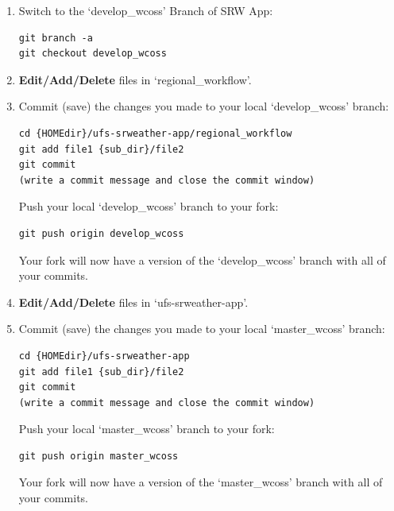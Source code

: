 \documentclass[11pt,fleqn]{report}              %
\begin{document}
\begin{enumerate}
\item Switch to the `develop\_wcoss' Branch of SRW App:
\lstset{language=bash}   
\begin{lstlisting}[frame=trBL]
git branch -a
git checkout develop_wcoss
\end{lstlisting}

\item {\bf Edit/Add/Delete} files in `regional\_workflow'. 

\vspace{0.2cm}

\item Commit (save) the changes you made to your local `develop\_wcoss' branch:

\lstset{language=bash}   
\begin{lstlisting}[frame=trBL]
cd {HOMEdir}/ufs-srweather-app/regional_workflow
git add file1 {sub_dir}/file2
git commit
(write a commit message and close the commit window)
\end{lstlisting}

Push your local `develop\_wcoss' branch to your fork:
\lstset{language=bash}   
\begin{lstlisting}[frame=trBL]
git push origin develop_wcoss
\end{lstlisting}
Your fork will now have a version of the `develop\_wcoss' branch with all of your commits.

\vspace{0.2cm}

\item {\bf Edit/Add/Delete} files in `ufs-srweather-app'. 

\vspace{0.2cm}

\item Commit (save) the changes you made to your local `master\_wcoss' branch:

\lstset{language=bash}   
\begin{lstlisting}[frame=trBL]
cd {HOMEdir}/ufs-srweather-app
git add file1 {sub_dir}/file2
git commit
(write a commit message and close the commit window)
\end{lstlisting}

Push your local `master\_wcoss' branch to your fork:
\lstset{language=bash}   
\begin{lstlisting}[frame=trBL]
git push origin master_wcoss
\end{lstlisting}
Your fork will now have a version of the `master\_wcoss' branch with all of your commits. 

\end{enumerate}
\end{document}
